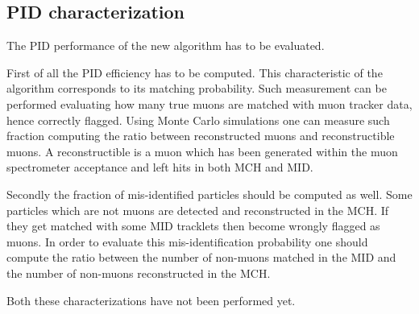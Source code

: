 \subsection{PID characterization}
The PID performance of the new algorithm has to be evaluated.

First of all the PID efficiency has to be computed.
This characteristic of the algorithm corresponds to its matching probability.
Such measurement can be performed evaluating how many true muons are matched with muon tracker data, hence correctly flagged.
Using Monte Carlo simulations one can measure such fraction computing the ratio between reconstructed muons and reconstructible muons.
A reconstructible is a muon which has been generated within the muon spectrometer acceptance and left hits in both MCH and MID.

Secondly the fraction of mis-identified particles should be computed as well.
Some particles which are not muons are detected and reconstructed in the MCH.
If they get matched with some MID tracklets then become wrongly flagged as muons.
In order to evaluate this mis-identification probability one should compute the ratio between the number of non-muons matched in the MID and the number of non-muons reconstructed in the MCH.

Both these characterizations have not been performed yet.

